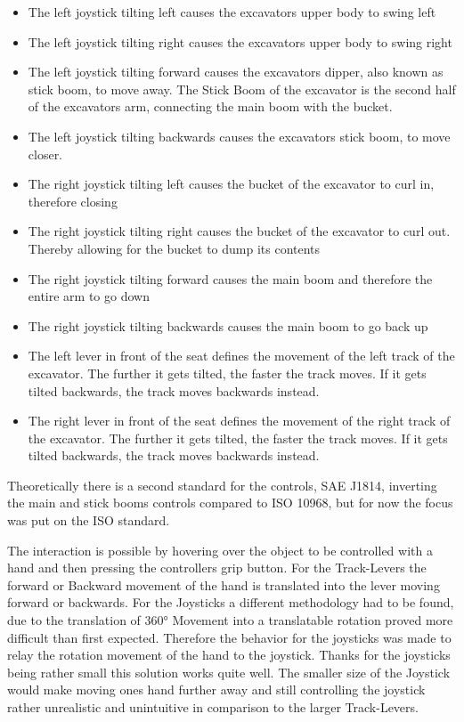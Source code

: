 \documentclass[journal]{vgtc}                     %
\begin{document}
\begin{itemize}
  \item The left joystick tilting left causes the excavators upper body to swing left
  \item The left joystick tilting right causes the excavators upper body to swing right
  \item The left joystick tilting forward causes the excavators dipper, also known as stick boom, to move away.
           The Stick Boom of the excavator is the second half of the excavators arm, connecting the main boom with the bucket.
  \item The left joystick tilting backwards causes the excavators stick boom, to move closer.
  \item The right joystick tilting left causes the bucket of the excavator to curl in, therefore closing
  \item The right joystick tilting right causes the bucket of the excavator to curl out. Thereby allowing for the bucket to dump its contents
  \item The right joystick tilting forward causes the main boom and therefore the entire arm to go down
  \item The right joystick tilting backwards causes the main boom to go back up 
  \item The left lever in front of the seat defines the movement of the left track of the excavator. The further it gets tilted, the faster the track moves. If it gets tilted backwards, the track moves backwards instead.
  \item The right lever in front of the seat defines the movement of the right track of the excavator. The further it gets tilted, the faster the track moves. If it gets tilted backwards, the track moves backwards instead.
\end{itemize}

Theoretically there is a second standard for the controls, SAE J1814, inverting the main and stick booms controls compared to ISO 10968, but for now the focus was put on the ISO standard.

The interaction is possible by hovering over the object to be controlled with a hand and then pressing the controllers grip button. For the Track-Levers the forward or Backward movement of the hand is translated into the lever moving forward or backwards. For the Joysticks a different methodology had to be found, due to the translation of 360° Movement into a translatable rotation proved more difficult than first expected. Therefore the behavior for the joysticks was made to relay the rotation movement of the hand to the joystick. Thanks for the joysticks being rather small this solution works quite well. The smaller size of the Joystick would make moving ones hand further away and still controlling the joystick rather unrealistic and unintuitive in comparison to the larger Track-Levers.
\end{document}

